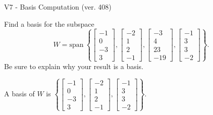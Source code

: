 \begin{exercise}
  \begin{exerciseTitle}V7 - Basis Computation (ver. 408)\end{exerciseTitle}
  \begin{exerciseStatement}
    Find a basis for the subspace 
\[W=\mathrm{span}\ \left\{\left[\begin{array}{r}
-1 \\
0 \\
-3 \\
3
\end{array}\right] , \left[\begin{array}{r}
-2 \\
1 \\
2 \\
-1
\end{array}\right] , \left[\begin{array}{r}
-3 \\
4 \\
23 \\
-19
\end{array}\right] , \left[\begin{array}{r}
-1 \\
3 \\
3 \\
-2
\end{array}\right]\right\}.\]
 Be sure to explain why your result is a basis.


  \end{exerciseStatement}
  \begin{exerciseAnswer}
   A basis of \(W\) is  \(\left\{\left[\begin{array}{r}
-1 \\
0 \\
-3 \\
3
\end{array}\right] , \left[\begin{array}{r}
-2 \\
1 \\
2 \\
-1
\end{array}\right] , \left[\begin{array}{r}
-1 \\
3 \\
3 \\
-2
\end{array}\right]\right\}\).
  


  \end{exerciseAnswer}
\end{exercise}